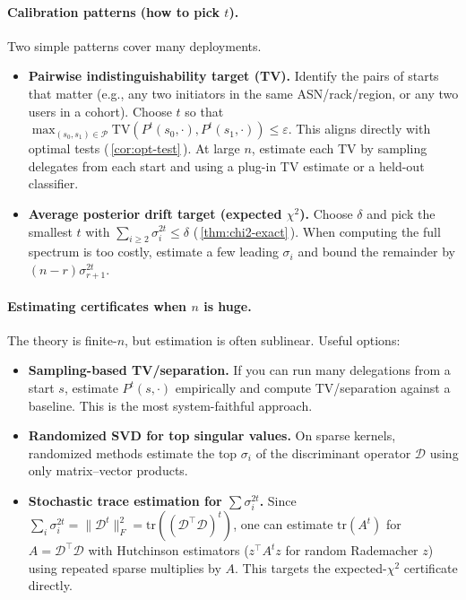 \documentclass[11pt]{article}
\newcommand{\TV}{\mathrm{TV}}
\newcommand{\cD}{\mathcal{D}}
\begin{document}
\paragraph{Calibration patterns (how to pick $t$).}
Two simple patterns cover many deployments.
\begin{itemize}[leftmargin=1.2em]
\item \textbf{Pairwise indistinguishability target (TV).} Identify the pairs of starts that matter
(e.g., any two initiators in the same ASN/rack/region, or any two users in a cohort). Choose $t$ so that
$\max_{(s_0,s_1)\in\mathcal{P}} \TV(P^t(s_0,\cdot),P^t(s_1,\cdot)) \le \varepsilon$.
This aligns directly with optimal tests (\,\cref{cor:opt-test}\,). At large $n$, estimate each TV
by sampling delegates from each start and using a plug-in TV estimate or a held-out classifier.
\item \textbf{Average posterior drift target (expected $\chi^2$).} Choose $\delta$ and pick the smallest $t$ with
$\sum_{i\ge2}\sigma_i^{2t}\le\delta$ (\,\cref{thm:chi2-exact}\,). When computing the full spectrum is too costly,
estimate a few leading $\sigma_i$ and bound the remainder by $(n-r)\sigma_{r+1}^{2t}$.
\end{itemize}

\paragraph{Estimating certificates when $n$ is huge.}
The theory is finite-$n$, but estimation is often sublinear. Useful options:
\begin{itemize}[leftmargin=1.2em]
\item \textbf{Sampling-based TV/separation.} If you can run many delegations from a start $s$,
estimate $P^t(s,\cdot)$ empirically and compute TV/separation against a baseline. This is the most
system-faithful approach.
\item \textbf{Randomized SVD for top singular values.} On sparse kernels, randomized methods estimate the top
$\sigma_i$ of the discriminant operator $\cD$ using only matrix--vector products.
\item \textbf{Stochastic trace estimation for $\sum\sigma_i^{2t}$.} Since
$\sum_{i}\sigma_i^{2t}=\|\cD^t\|_F^2=\mathrm{tr}((\cD^\top\cD)^t)$,
one can estimate $\mathrm{tr}(A^t)$ for $A=\cD^\top\cD$ with Hutchinson estimators
($z^\top A^t z$ for random Rademacher $z$) using repeated sparse multiplies by $A$.
This targets the expected-$\chi^2$ certificate directly.
\end{itemize}
\end{document}
